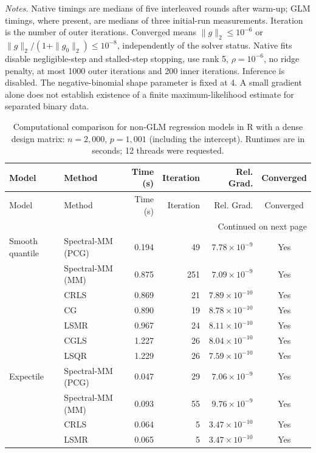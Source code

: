 \noindent\textit{Notes.} Native timings are medians of five interleaved rounds after warm-up; GLM timings, where present, are medians of three initial-run measurements. Iteration is the number of outer iterations. Converged means $\|g\|_2\leq10^{-6}$ or $\|g\|_2/(1+\|g_0\|_2)\leq10^{-8}$, independently of the solver status. Native fits disable negligible-step and stalled-step stopping, use rank 5, $\rho=10^{-6}$, no ridge penalty, at most 1000 outer iterations and 200 inner iterations. Inference is disabled.
The negative-binomial shape parameter is fixed at 4. A small gradient alone does not establish existence of a finite maximum-likelihood estimate for separated binary data.
\par
\endgroup

\clearpage
\begingroup
\small
\setlength{\tabcolsep}{5pt}
\begin{longtable}{llrrrc}
\caption{Computational comparison for non-GLM regression models in R with a dense design matrix: $n=2{,}000$, $p=1{,}001$ (including the intercept). Runtimes are in seconds; 12 threads were requested.}
\label{tab:R-dense-nonglm-strict}\\
\toprule
Model & Method & Time (s) & Iteration & Rel. Grad. & Converged \\
\midrule
\endfirsthead
\toprule
Model & Method & Time (s) & Iteration & Rel. Grad. & Converged \\
\midrule
\endhead
\midrule
\multicolumn{6}{r}{Continued on next page}\\
\endfoot
\bottomrule
\endlastfoot
Smooth quantile & Spectral-MM (PCG) & 0.194 & 49 & $7.78\times10^{-9}$ & Yes \\
 & Spectral-MM (MM) & 0.875 & 251 & $7.09\times10^{-9}$ & Yes \\
 & CRLS & 0.869 & 21 & $7.89\times10^{-10}$ & Yes \\
 & CG & 0.890 & 19 & $8.78\times10^{-10}$ & Yes \\
 & LSMR & 0.967 & 24 & $8.11\times10^{-10}$ & Yes \\
 & CGLS & 1.227 & 26 & $8.04\times10^{-10}$ & Yes \\
 & LSQR & 1.229 & 26 & $7.59\times10^{-10}$ & Yes \\
\midrule
Expectile & Spectral-MM (PCG) & 0.047 & 29 & $7.06\times10^{-9}$ & Yes \\
 & Spectral-MM (MM) & 0.093 & 55 & $9.76\times10^{-9}$ & Yes \\
 & CRLS & 0.064 & 5 & $3.47\times10^{-10}$ & Yes \\
 & LSMR & 0.065 & 5 & $3.47\times10^{-10}$ & Yes \\

\end{longtable}
